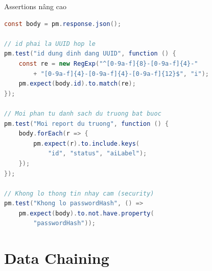 \documentclass[aspectratio=169,12pt]{beamer}
\begin{document}
\begin{frame}[fragile]{Assertions nâng cao}
\begin{lstlisting}[language=Java,basicstyle=\ttfamily\scriptsize]
const body = pm.response.json();

// id phai la UUID hop le
pm.test("id dung dinh dang UUID", function () {
    const re = new RegExp("^[0-9a-f]{8}-[0-9a-f]{4}-"
        + "[0-9a-f]{4}-[0-9a-f]{4}-[0-9a-f]{12}$", "i");
    pm.expect(body.id).to.match(re);
});

// Moi phan tu danh sach du truong bat buoc
pm.test("Moi report du truong", function () {
    body.forEach(r => {
        pm.expect(r).to.include.keys(
            "id", "status", "aiLabel");
    });
});

// Khong lo thong tin nhay cam (security)
pm.test("Khong lo passwordHash", () =>
    pm.expect(body).to.not.have.property(
        "passwordHash"));
\end{lstlisting}
\end{frame}

\section{Data Chaining}
\end{document}
